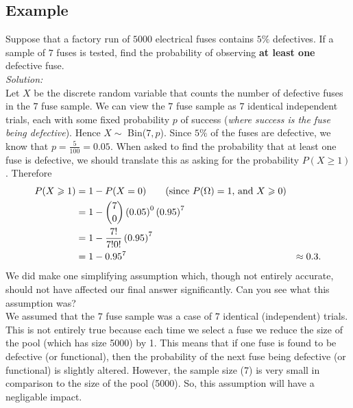 \subsection{Example} \label{ex10.2.2}
Suppose that a factory run of $5000$ electrical fuses contains $5\%$ defectives. If a sample of $7$ fuses is tested, find the probability of observing \textbf{at least one} defective fuse. \\

\noindent \textit{Solution:} \\
Let $X$ be the discrete random variable that counts the number of defective fuses in the $7$ fuse sample. We can view the $7$ fuse sample as $7$ identical independent trials, each with some fixed probability $p$ of success (\textit{where success is the fuse being defective}). Hence $X \sim $ Bin($7,p$). Since $5\%$ of the fuses are defective, we know that $p = \frac{5}{100} = 0.05$. When asked to find the probability that at least one fuse is defective, we should translate this as asking for the probability $P(X \geq 1)$. Therefore
\begin{align*}
P(X \geq 1) & = 1 - P(X = 0) \tag{since $P(\Omega) = 1$, and $X \geq 0$} \\
		  & = 1 - \binom{7}{0}\brac{0.05}^0\brac{0.95}^7 \\
		  & = 1 - \frac{7!}{7!0!}\brac{0.95}^7 \\
		  & = 1 - 0.95^7
		  & \approx 0.3.
\end{align*}
We did make one simplifying assumption which, though not entirely accurate, should not have affected our final answer significantly. Can you see what this assumption was? \\

\noindent We assumed that the $7$ fuse sample was a case of $7$ identical (independent) trials. This is not entirely true because each time we select a fuse we reduce the size of the pool (which has size 5000) by 1. This means that if one fuse is found to be defective (or functional), then the probability of the next fuse being defective (or functional) is slightly altered. However, the sample size (7) is very small in comparison to the size of the pool (5000). So, this assumption will have a negligable impact.  



